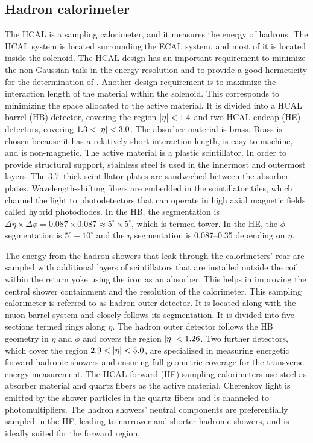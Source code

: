 \subsection{Hadron calorimeter}

The HCAL is a sampling calorimeter, and it measures the energy of hadrons. The HCAL system is located surrounding the ECAL system, and most of it is located inside the solenoid. The HCAL design has an important requirement to minimize the non-Gaussian tails in the energy resolution and to provide a good hermeticity for the determination of \met. Another design requirement is to maximize the interaction length of the material within the solenoid. This corresponds to minimizing the space allocated to the active material. It is divided into a HCAL barrel (HB) detector, covering the region $\lvert\eta\rvert < 1.4$ and two HCAL endcap (HE) detectors, covering $1.3 < \lvert\eta\rvert < 3.0$. The absorber material is brass. Brass is chosen because it has a relatively short interaction length, is easy to machine, and is non-magnetic. The active material is a plastic scintillator. In order to provide structural support, stainless steel is used in the innermost and outermost layers. The 3.7~\mm thick scintillator plates are sandwiched between the absorber plates. Wavelength-shifting fibers are embedded in the scintillator tiles, which channel the light to photodetectors that can operate in high axial magnetic fields called hybrid photodiodes. In the HB, the segmentation is $\Delta \eta \times \Delta \phi = 0.087 \times 0.087 \approx 5^{\circ} \times 5^{\circ}$, which is termed tower. In the HE, the $\phi$ segmentation is $5^\circ - 10^\circ$ and the $\eta$ segmentation is 0.087--0.35 depending on $\eta$.

The energy from the hadron showers that leak through the calorimeters' rear are sampled with additional layers of scintillators that are installed outside the coil within the return yoke using the iron as an absorber. This helps in improving the central shower containment and the \met resolution of the calorimeter. This sampling calorimeter is referred to as hadron outer detector. It is located along with the muon barrel system and closely follows its segmentation. It is divided into five sections termed rings along $\eta$. The hadron outer detector follows the HB geometry in $\eta$ and $\phi$ and covers the region $\lvert\eta\rvert < 1.26$. Two further detectors, which cover the region $2.9 < \lvert\eta\rvert < 5.0$, are specialized in measuring energetic forward hadronic showers and ensuring full geometric coverage for the transverse energy measurement. The HCAL forward (HF) sampling calorimeters use steel as absorber material and quartz fibers as the active material. Cherenkov light is emitted by the shower particles in the quartz fibers and is channeled to photomultipliers. The hadron showers' neutral components are preferentially sampled in the HF, leading to narrower and shorter hadronic showers, and is ideally suited for the forward region.


